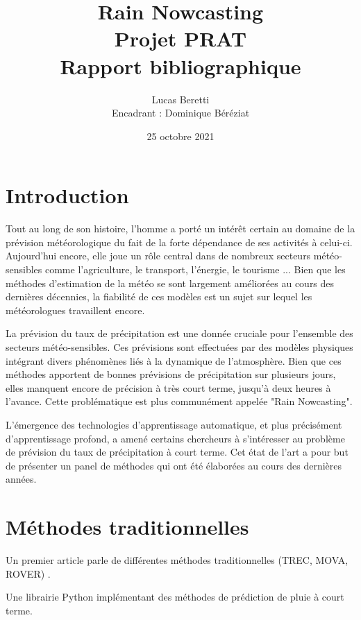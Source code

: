 \documentclass[11pt,a4paper,french]{article}
\title{\LARGE{Rain Nowcasting} \\ [0.5cm]\Large{Projet PRAT} \\ [0.25cm]\large{Rapport bibliographique}}
\author{Lucas Beretti \\ Encadrant : Dominique Béréziat}
\date{25 octobre 2021}
\begin{document}
\maketitle

\tableofcontents

\newpage

\section{Introduction}

Tout au long de son histoire, l'homme a porté un intérêt certain au domaine de la prévision météorologique du fait de la forte dépendance de ses activités à celui-ci. Aujourd'hui encore, elle joue un rôle central dans de nombreux secteurs météo-sensibles comme l'agriculture, le transport, l'énergie, le tourisme ... Bien que les méthodes d'estimation de la météo se sont largement améliorées au cours des dernières décennies, la fiabilité de ces modèles est un sujet sur lequel les météorologues travaillent encore.

La prévision du taux de précipitation est une donnée cruciale pour l'ensemble des secteurs météo-sensibles. Ces prévisions sont effectuées par des modèles physiques intégrant divers phénomènes liés à la dynamique de l'atmosphère. Bien que ces méthodes apportent de bonnes prévisions de précipitation sur plusieurs jours, elles manquent encore de précision à très court terme, jusqu'à deux heures à l'avance. Cette problématique est plus communément appelée "Rain Nowcasting".

L'émergence des technologies d'apprentissage automatique, et plus précisément d'apprentissage profond, a amené certains chercheurs à s'intéresser au problème de prévision du taux de précipitation à court terme. 
Cet état de l'art a pour but de présenter un panel de méthodes qui ont été élaborées au cours des dernières années.



\section{Méthodes traditionnelles}

Un premier article parle de différentes méthodes traditionnelles (TREC, MOVA, ROVER) \cite{atmos8030048}. \newline

\noindent
Une librairie Python implémentant des méthodes de prédiction de pluie à court terme. \cite{article}
\end{document}
